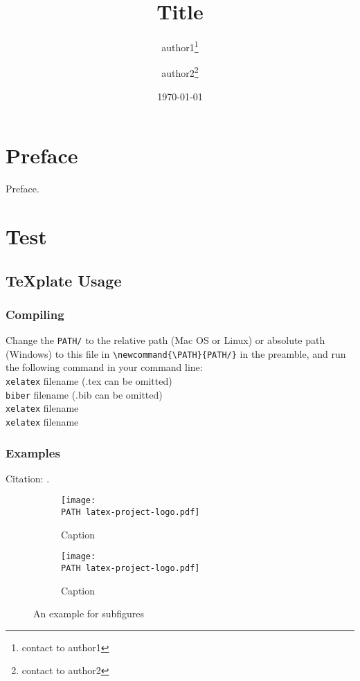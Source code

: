\documentclass[openany]{book}
\title{Title}
\author{ author1\thanks{contact to author1}
	\and
		author2\thanks{contact to author2}}
\date{\today} %
\newcommand{\PATH}{PATH/}
\theoremstyle{plain}
\theoremstyle{definition}
\begin{document}
\maketitle %
\thispagestyle{empty}
\frontmatter
\chapter{Preface}
Preface.

\tableofcontents

\mainmatter
\chapter{Test}
\section{\texorpdfstring{\TeX{}plate Usage}{TeXplate Usage}}
\subsection{Compiling}

Change the \verb|PATH/| to the relative path (Mac OS or Linux) or absolute path (Windows) to this file in \verb|\newcommand{\PATH}{PATH/}| in the preamble, and run the following command in your command line:\\[0pt]
\verb|xelatex| filename (.tex can be omitted)\\
\verb|biber| filename (.bib can be omitted)\\
\verb|xelatex| filename\\
\verb|xelatex| filename

\subsection{Examples}

Citation: \cite{Knuth}.

\begin{figure}[h] %
\centering
\begin{subfigure}{.5\textwidth}
	\centering
	\texttt{[image: \\PATH latex-project-logo.pdf]}
	\caption{Caption}
	\label{subfigure1}
\end{subfigure}%
\begin{subfigure}{.5\textwidth}
	\centering
	\texttt{[image: \\PATH latex-project-logo.pdf]}
	\caption{Caption}
	\label{subfigure2}
\end{subfigure}
\caption{An example for subfigures}
\end{figure}
\end{document}

